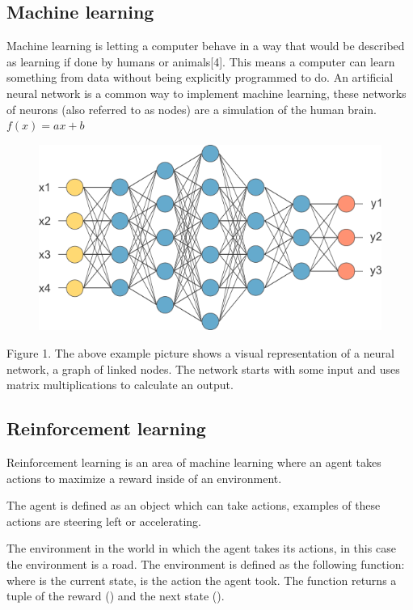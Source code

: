 \documentclass{article}
\begin{document}
\subsection{Machine learning}
Machine learning is letting a computer behave in a way that would be described as learning if done by humans or animals[4]. This means a computer can learn something from data without being explicitly programmed to do. An artificial neural network is a common way to implement machine learning, these networks of neurons (also referred to as nodes) are a simulation of the human brain. $ f(x)=ax+b $

\begin{figure}
\includegraphics[width=\linewidth]{neural_net}
\end{figure}

\begin{flushleft}
Figure 1\cite{neuralnetwork}. The above example picture shows a visual representation of a neural network, a graph of linked nodes. The network starts with some input and uses matrix multiplications to calculate an output. 
\end{flushleft}

\subsection{Reinforcement learning}
Reinforcement learning is an area of machine learning where an agent takes actions to maximize a reward inside of an environment. 

\begin{flushleft}
The agent is defined as an object which can take actions, examples of these actions are steering left or accelerating. 
\end{flushleft}

\begin{flushleft}
The environment in the world in which the agent takes its actions, in this case the environment is a road. The environment is defined as the following function:  where  is the current state,  is the action the agent took. The function returns a tuple of the reward () and the next state ().
\end{flushleft}
\end{document}
